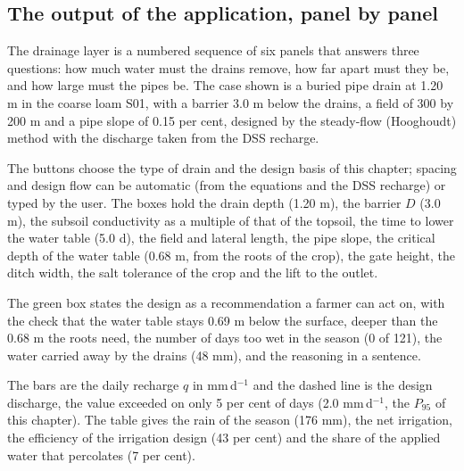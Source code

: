 \subsection{The output of the application, panel by panel}
The drainage layer is a numbered sequence of six panels that answers three questions: how much water must the drains remove, how far apart must they be, and how large must the pipes be. The case shown is a buried pipe drain at 1.20 m in the coarse loam S01, with a barrier 3.0 m below the drains, a field of 300 by 200 m and a pipe slope of 0.15 per cent, designed by the steady-flow (Hooghoudt) method with the discharge taken from the DSS recharge.

The buttons choose the type of drain and the design basis of this chapter; spacing and design flow can be automatic (from the equations and the DSS recharge) or typed by the user. The boxes hold the drain depth (1.20 m), the barrier $D$ (3.0 m), the subsoil conductivity as a multiple of that of the topsoil, the time to lower the water table (5.0 d), the field and lateral length, the pipe slope, the critical depth of the water table (0.68 m, from the roots of the crop), the gate height, the ditch width, the salt tolerance of the crop and the lift to the outlet.


The green box states the design as a recommendation a farmer can act on, with the check that the water table stays 0.69 m below the surface, deeper than the 0.68 m the roots need, the number of days too wet in the season (0 of 121), the water carried away by the drains (48 mm), and the reasoning in a sentence.


The bars are the daily recharge $q$ in mm\,d$^{-1}$ and the dashed line is the design discharge, the value exceeded on only 5 per cent of days (2.0 mm\,d$^{-1}$, the $P_{95}$ of this chapter). The table gives the rain of the season (176 mm), the net irrigation, the efficiency of the irrigation design (43 per cent) and the share of the applied water that percolates (7 per cent).



